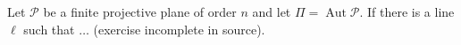 Let $\mathcal{P}$ be a finite projective plane of order $n$ and let $\Pi = \operatorname{Aut}\mathcal{P}$. If there is a line $\ell$ such that $\dots$ (exercise incomplete in source).
